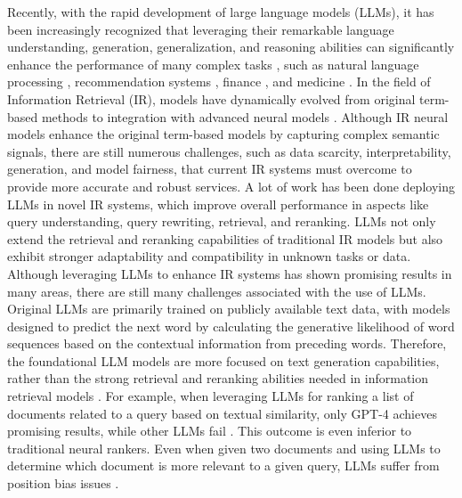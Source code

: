 \documentclass[sigconf,natbib=true,anonymous=false]{acmart}
\begin{document}
Recently, with the rapid development of large language models (LLMs), it has been increasingly recognized that leveraging their remarkable language understanding, generation, generalization, and reasoning abilities can significantly enhance the performance of many complex tasks \cite{DBLP:journals/tmlr/WeiTBRZBYBZMCHVLDF22}, such as natural language processing \cite{Radford2019LanguageMA, brown2020language, DBLP:journals/corr/abs-2302-13971}, recommendation systems \cite{DBLP:journals/corr/abs-2305-07001, DBLP:journals/corr/abs-2305-08845, DBLP:journals/corr/abs-2306-10933}, finance \cite{DBLP:journals/corr/abs-2303-17564}, and medicine \cite{DBLP:journals/corr/abs-2311-05112}. In the field of Information Retrieval (IR), models have dynamically evolved from original term-based methods to integration with advanced neural models \cite{DBLP:conf/emnlp/KarpukhinOMLWEC20, khattab2020colbert}. Although IR neural models enhance the original term-based models by capturing complex semantic signals, there are still numerous challenges, such as data scarcity, interpretability, generation, and model fairness, that current IR systems must overcome to provide more accurate and robust services. A lot of work has been done deploying LLMs in novel IR systems, which improve overall performance in aspects like query understanding, query rewriting, retrieval, and reranking. LLMs not only extend the retrieval and reranking capabilities of traditional IR models but also exhibit stronger adaptability and compatibility in unknown tasks or data. Although leveraging LLMs to enhance IR systems has shown promising results in many areas, there are still many challenges associated with the use of LLMs. Original LLMs are primarily trained on publicly available text data, with models designed to predict the next word by calculating the generative likelihood of word sequences based on the contextual information from preceding words. Therefore, the foundational LLM models are more focused on text generation capabilities, rather than the strong retrieval and reranking abilities needed in information retrieval models \cite{DBLP:journals/tmlr/WeiTBRZBYBZMCHVLDF22}. For example, when leveraging LLMs for ranking a list of documents related to a query based on textual similarity, only GPT-4 achieves promising results, while other LLMs fail \cite{DBLP:conf/emnlp/0001YMWRCYR23, DBLP:journals/corr/abs-2305-02156, DBLP:journals/corr/abs-2310-07712}. This outcome is even inferior to traditional neural rankers. Even when given two documents and using LLMs to determine which document is more relevant to a given query, LLMs suffer from position bias issues \cite{DBLP:journals/corr/abs-2306-17563}. 
\end{document}
